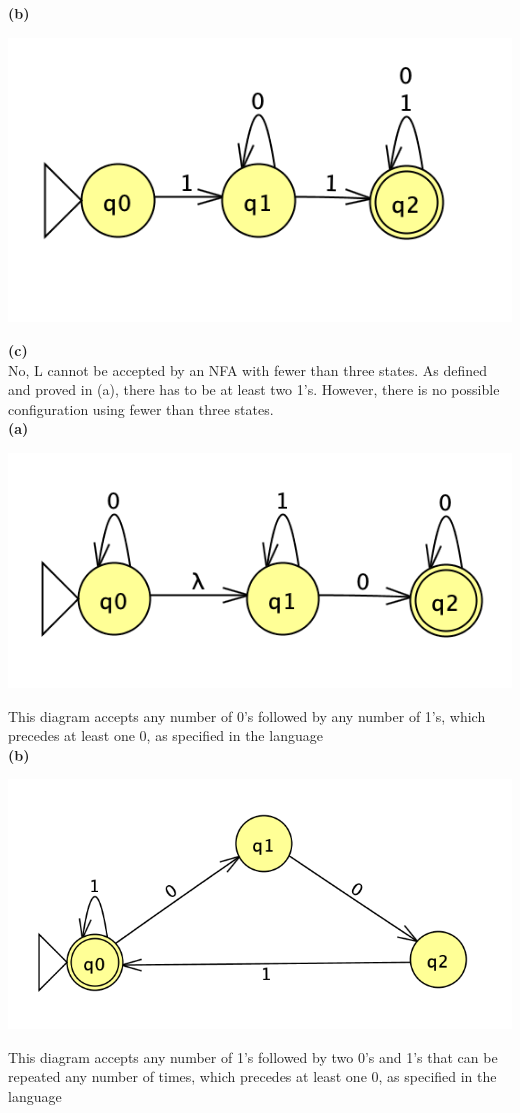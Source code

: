 \documentclass{homework}
\begin{document}
\textbf{(b)}\\
\begin{center}
    \includegraphics{A2Q2.png}\\
\end{center}

\textbf{(c)}\\
No, L cannot be accepted by an NFA with fewer than three states. As defined and proved in (a), there has to be at least two 1's. However, there is no possible configuration  using fewer than three states.\\

\question
\textbf{(a)}\\
\begin{center}
    \includegraphics{A2Q3A.png}
\end{center}
This diagram accepts any number of 0's followed by any number of 1's, which precedes at least one 0, as specified in the language\\
\textbf{(b)}\\
\begin{center}
    \includegraphics{A2Q3B.png}
\end{center}
This diagram accepts any number of 1's followed by two 0's and 1's that can be repeated any number of times, which precedes at least one 0, as specified in the language\\
\end{document}

